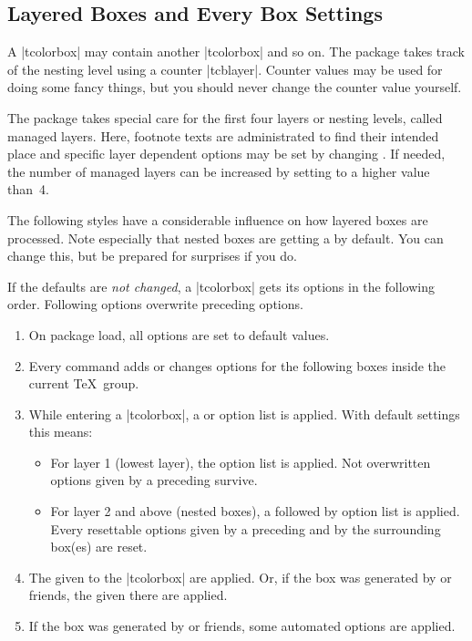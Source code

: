 \clearpage
\subsection{Layered Boxes and Every Box Settings}\label{subsec:everybox}
A |tcolorbox| may contain another |tcolorbox| and so on. The package
takes track of the nesting level using a counter |tcblayer|. Counter values
may be used for doing some fancy things, but you should never change
the counter value yourself.

The package takes special care for the first four layers or nesting levels,
called managed layers.
Here, footnote texts are administrated to find their intended place
and specific layer dependent options may be set by changing
.
If needed, the number of managed layers can be increased by setting
 to a higher value than~4.

The following styles have a considerable influence on how layered boxes
are processed. Note especially that nested boxes are getting a
 by default. You can change this, but be prepared for
surprises if you do.

If the defaults are \emph{not changed}, a |tcolorbox| gets its options
in the following order. Following options overwrite preceding options.
\begin{enumerate}
\item On package load, all options are set to default values.
\item Every  command adds or changes options for the following boxes
  inside the current \TeX\ group.
\item While entering a |tcolorbox|, a  or
   option list is applied.
  With default settings this means:
  \begin{itemize}
  \item For layer 1 (lowest layer), the  option list is applied.
    Not overwritten options given by a preceding  survive.
  \item For layer 2 and above (nested boxes), a  followed by
     option list is applied.
    Every resettable options given by a preceding 
    and by the surrounding box(es) are reset.
  \end{itemize}
\item The  given to the |tcolorbox| are applied.
  Or, if the box was generated by  or friends,
  the  given there are applied.
\item If the box was generated by  or friends,
  some automated options are applied.
\end{enumerate}


